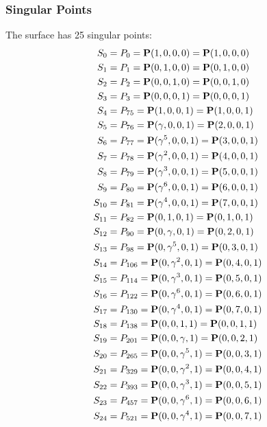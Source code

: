 \documentclass{article}
\newcommand{\bP}{{\bf P}}
\begin{document}
{\subsubsection*{Singular Points}
The surface has 25 singular points:\\
\begin{align*}
S_{0} &= P_{0}=\bP(1, 0, 0, 0) = \bP(1, 0, 0, 0)\\
S_{1} &= P_{1}=\bP(0, 1, 0, 0) = \bP(0, 1, 0, 0)\\
S_{2} &= P_{2}=\bP(0, 0, 1, 0) = \bP(0, 0, 1, 0)\\
S_{3} &= P_{3}=\bP(0, 0, 0, 1) = \bP(0, 0, 0, 1)\\
S_{4} &= P_{75}=\bP(1, 0, 0, 1) = \bP(1, 0, 0, 1)\\
S_{5} &= P_{76}=\bP(\gamma , 0, 0, 1) = \bP(2, 0, 0, 1)\\
S_{6} &= P_{77}=\bP(\gamma^{5}, 0, 0, 1) = \bP(3, 0, 0, 1)\\
S_{7} &= P_{78}=\bP(\gamma^{2}, 0, 0, 1) = \bP(4, 0, 0, 1)\\
S_{8} &= P_{79}=\bP(\gamma^{3}, 0, 0, 1) = \bP(5, 0, 0, 1)\\
S_{9} &= P_{80}=\bP(\gamma^{6}, 0, 0, 1) = \bP(6, 0, 0, 1)\\
S_{10} &= P_{81}=\bP(\gamma^{4}, 0, 0, 1) = \bP(7, 0, 0, 1)\\
S_{11} &= P_{82}=\bP(0, 1, 0, 1) = \bP(0, 1, 0, 1)\\
S_{12} &= P_{90}=\bP(0, \gamma , 0, 1) = \bP(0, 2, 0, 1)\\
S_{13} &= P_{98}=\bP(0, \gamma^{5}, 0, 1) = \bP(0, 3, 0, 1)\\
S_{14} &= P_{106}=\bP(0, \gamma^{2}, 0, 1) = \bP(0, 4, 0, 1)\\
S_{15} &= P_{114}=\bP(0, \gamma^{3}, 0, 1) = \bP(0, 5, 0, 1)\\
S_{16} &= P_{122}=\bP(0, \gamma^{6}, 0, 1) = \bP(0, 6, 0, 1)\\
S_{17} &= P_{130}=\bP(0, \gamma^{4}, 0, 1) = \bP(0, 7, 0, 1)\\
S_{18} &= P_{138}=\bP(0, 0, 1, 1) = \bP(0, 0, 1, 1)\\
S_{19} &= P_{201}=\bP(0, 0, \gamma , 1) = \bP(0, 0, 2, 1)\\
S_{20} &= P_{265}=\bP(0, 0, \gamma^{5}, 1) = \bP(0, 0, 3, 1)\\
S_{21} &= P_{329}=\bP(0, 0, \gamma^{2}, 1) = \bP(0, 0, 4, 1)\\
S_{22} &= P_{393}=\bP(0, 0, \gamma^{3}, 1) = \bP(0, 0, 5, 1)\\
S_{23} &= P_{457}=\bP(0, 0, \gamma^{6}, 1) = \bP(0, 0, 6, 1)\\
S_{24} &= P_{521}=\bP(0, 0, \gamma^{4}, 1) = \bP(0, 0, 7, 1)\\
\end{align*}
}
\end{document}
